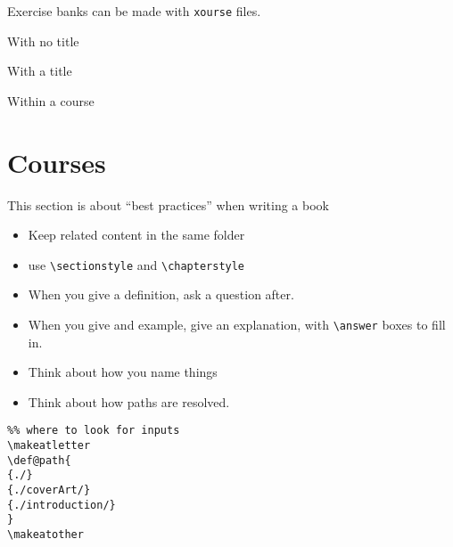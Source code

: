 \documentclass{ximera}
\begin{document}
Exercise banks can be made with \verb!xourse! files.

With no title

With a title

Within a course

    \section{Courses}

    This section is about ``best practices'' when writing a book
    \begin{itemize}
      \item Keep related content in the same folder
      \item use \texttt{\textbackslash sectionstyle} and
            \texttt{\textbackslash chapterstyle}
      \item When you give a definition, ask a question after.
      \item When you give and example, give an explanation, with
            \texttt{\textbackslash answer} boxes to fill in.
      \item Think about how you name things
      \item Think about how paths are resolved.
    \end{itemize}

    \begin{verbatim}
%% where to look for inputs
\makeatletter
\def@path{
{./}
{./coverArt/}
{./introduction/}
}
\makeatother
\end{verbatim}
    \pdfOnly{\end{multicols}}
\end{document}

